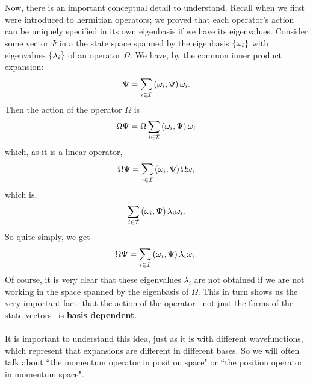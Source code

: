 \\\\
Now, there is an important conceptual detail to understand. Recall when we first were introduced to hermitian operators; we proved that each operator's action can be uniquely specified in its own eigenbasis if we have its eigenvalues. Consider some vector $\Psi$ in a the state space spanned by the eigenbasis $\{\omega_{i}\}$ with eigenvalues $\{\lambda_{i}\}$ of an operator $\Omega$. We have, by the common inner product expansion:
$$
\Psi=\sum_{i\in\mathcal{I}}\left(\omega_{i},\Psi\right)\omega_{i}.
$$
Then the action of the operator $\Omega$ is 
$$
\Omega \Psi = \Omega\sum_{i\in\mathcal{I}}\left(\omega_{i},\Psi\right)\omega_{i}
$$
which, as it is a linear operator,
$$
\Omega\Psi=\sum_{i\in\mathcal{I}}\left(\omega_{i},\Psi\right)\Omega\omega_{i}
$$
which is,
$$
\sum_{i\in\mathcal{I}}\left(\omega_{i},\Psi\right)\lambda_{i}\omega_{i}.
$$
So quite simply, we get 
$$
\Omega \Psi = \sum_{i\in\mathcal{I}}\left(\omega_{i},\Psi\right)\lambda_{i}\omega_{i}.
$$
    Of course, it is very clear that these eigenvalues $\lambda_{i}$ are not obtained if we are not working in the space spanned by the eigenbasis of $\Omega$. This in turn shows us the very important fact: that the action of the operator-- not just the forms of the state vectors-- is \textbf{basis dependent}.  
\\\\
It is important to understand this idea, just as it is with different wavefunctions, which represent that expansions are different in different bases. So we will often talk about ``the momentum operator in position space" or ``the position operator in momentum space".   
